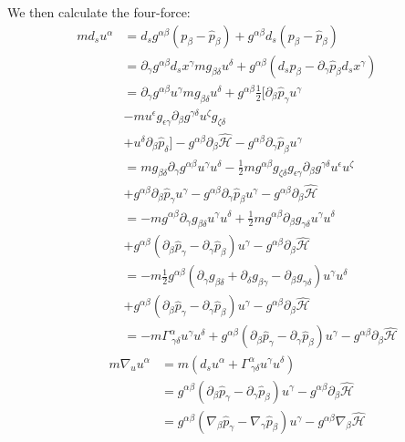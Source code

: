 \documentclass[aps,pra,10pt,twocolumn,floatfix,nofootinbib]{revtex4-1}
\theoremstyle{definition}
\begin{document}
We then calculate the four-force:
\begin{align*}
m d_s u^\alpha &= d_s g^{\alpha\beta}(p_\beta-\hat{p}_\beta) + g^{\alpha\beta} d_s (p_\beta-\hat{p}_\beta) \\
&= \partial_\gamma g^{\alpha\beta} d_s x^\gamma m g_{\beta \delta} u^\delta + g^{\alpha\beta} (d_s p_\beta - \partial_\gamma \hat{p}_\beta d_s x^\gamma) \\
&= \partial_\gamma g^{\alpha\beta} u^\gamma m g_{\beta \delta} u^\delta + g^{\alpha\beta} \frac{1}{2} [\partial_\beta \hat{p}_\gamma u^\gamma \\
&- m u^\epsilon g_{\epsilon\gamma} \partial_\beta g^{\gamma \delta} u^\zeta g_{\zeta\delta} \\
&+ u^\delta \partial_\beta \hat{p}_\delta ]- g^{\alpha\beta} \partial_\beta \hat{\mathcal{H}} - g^{\alpha\beta} \partial_\gamma \hat{p}_\beta u^\gamma \\
&= m  g_{\beta \delta} \partial_\gamma g^{\alpha\beta} u^\gamma u^\delta - \frac{1}{2} m g^{\alpha\beta} g_{\zeta\delta} g_{\epsilon\gamma} \partial_\beta g^{\gamma \delta} u^\epsilon u^\zeta  \\
&+ g^{\alpha\beta} \partial_\beta \hat{p}_\gamma u^\gamma - g^{\alpha\beta} \partial_\gamma \hat{p}_\beta u^\gamma
- g^{\alpha\beta} \partial_\beta \hat{\mathcal{H}}\\
&= - m  g^{\alpha \beta} \partial_\gamma g_{\beta\delta} u^\gamma u^\delta + \frac{1}{2} m g^{\alpha\beta} \partial_\beta g_{\gamma \delta} u^\gamma u^\delta  \\
&+ g^{\alpha\beta} (\partial_\beta \hat{p}_\gamma - \partial_\gamma \hat{p}_\beta ) u^\gamma
- g^{\alpha\beta} \partial_\beta \hat{\mathcal{H}}\\
&= - m \frac{1}{2} g^{\alpha \beta} ( \partial_\gamma g_{\beta\delta} + \partial_\delta g_{\beta\gamma} - \partial_\beta g_{\gamma \delta} ) u^\gamma u^\delta  \\
&+ g^{\alpha\beta} (\partial_\beta \hat{p}_\gamma - \partial_\gamma \hat{p}_\beta ) u^\gamma
- g^{\alpha\beta} \partial_\beta \hat{\mathcal{H}}\\
&= - m \Gamma ^\alpha_{\ \gamma \delta} u^\gamma u^\delta + g^{\alpha\beta} (\partial_\beta \hat{p}_\gamma - \partial_\gamma \hat{p}_\beta ) u^\gamma
- g^{\alpha\beta} \partial_\beta \hat{\mathcal{H}}
\end{align*}
\begin{align*}
m \nabla_{u} u^\alpha &= m (d_s u^\alpha + \Gamma ^\alpha_{\ \gamma \delta} u^\gamma u^\delta)  \\
&= g^{\alpha\beta} (\partial_\beta \hat{p}_\gamma - \partial_\gamma \hat{p}_\beta ) u^\gamma - g^{\alpha\beta} \partial_\beta \hat{\mathcal{H}}\\
&= g^{\alpha\beta} (\nabla_\beta \hat{p}_\gamma - \nabla_\gamma \hat{p}_\beta ) u^\gamma - g^{\alpha\beta} \nabla_\beta \hat{\mathcal{H}}
\end{align*}
\end{document}
